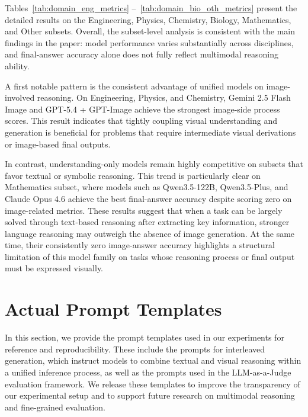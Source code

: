 \documentclass[11pt]{article}
\begin{document}
Tables~\ref{tab:domain_eng_metrics} --~\ref{tab:domain_bio_oth_metrics} present the detailed results on the Engineering, Physics, Chemistry, Biology, Mathematics, and Other subsets. Overall, the subset-level analysis is consistent with the main findings in the paper: model performance varies substantially across disciplines, and final-answer accuracy alone does not fully reflect multimodal reasoning ability.

A first notable pattern is the consistent advantage of unified models on image-involved reasoning. On Engineering, Physics, and Chemistry, Gemini 2.5 Flash Image and GPT-5.4 + GPT-Image achieve the strongest image-side process scores. This result indicates that tightly coupling visual understanding and generation is beneficial for problems that require intermediate visual derivations or image-based final outputs.

In contrast, understanding-only models remain highly competitive on subsets that favor textual or symbolic reasoning. This trend is particularly clear on Mathematics subset, where models such as Qwen3.5-122B, Qwen3.5-Plus, and Claude Opus 4.6 achieve the best final-answer accuracy despite scoring zero on image-related metrics. These results suggest that when a task can be largely solved through text-based reasoning after extracting key information, stronger language reasoning may outweigh the absence of image generation. At the same time, their consistently zero image-answer accuracy highlights a structural limitation of this model family on tasks whose reasoning process or final output must be expressed visually.

\section{Actual Prompt Templates}

In this section, we provide the prompt templates used in our experiments for reference and reproducibility. These include the prompts for interleaved generation, which instruct models to combine textual and visual reasoning within a unified inference process, as well as the prompts used in the LLM-as-a-Judge evaluation framework. We release these templates to improve the transparency of our experimental setup and to support future research on multimodal reasoning and fine-grained evaluation.




\clearpage
\onecolumn
\end{document}
